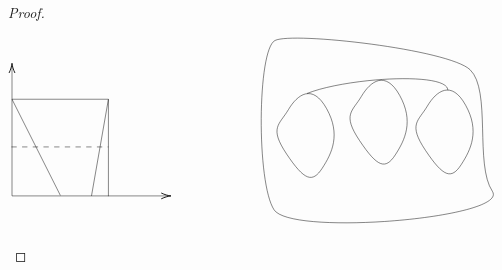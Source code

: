 \documentclass{article}
\begin{document}
\begin{proof}
\[\begin{tikzpicture}[x=0.75pt,y=0.75pt,yscale=-1,xscale=1]
    \draw    (32.81,206.45) -- (32.81,58.93) ;
    \draw [shift={(32.81,56.93)}, rotate = 90] [color={rgb, 255:red, 0; green, 0; blue, 0 }  ][line width=0.75]    (10.93,-3.29) .. controls (6.95,-1.4) and (3.31,-0.3) .. (0,0) .. controls (3.31,0.3) and (6.95,1.4) .. (10.93,3.29)   ;
    \draw    (32.81,206.45) -- (209.29,206.45) ;
    \draw [shift={(211.29,206.45)}, rotate = 180] [color={rgb, 255:red, 0; green, 0; blue, 0 }  ][line width=0.75]    (10.93,-3.29) .. controls (6.95,-1.4) and (3.31,-0.3) .. (0,0) .. controls (3.31,0.3) and (6.95,1.4) .. (10.93,3.29)   ;
    \draw    (32.81,97.47) -- (141.05,97.47) ;
    \draw    (141.05,97.47) -- (141.05,206.8) ;
    \draw    (32.81,97.47) -- (87.11,205.89) ;
    \draw    (141.05,97.47) -- (122.05,206.45) ;
    \draw  [dash pattern={on 4.5pt off 4.5pt}]  (32.11,151.22) -- (141.05,151.22) ;
    \draw   (328.11,31.22) .. controls (348.11,21.22) and (523.11,41.22) .. (547.11,64.22) .. controls (571.11,87.22) and (552.11,171.22) .. (572.11,201.22) .. controls (592.11,231.22) and (347.11,252.22) .. (327.11,222.22) .. controls (307.11,192.22) and (308.11,41.22) .. (328.11,31.22) -- cycle ;
    \draw   (343.11,109.22) .. controls (353.11,92.22) and (370.11,79.22) .. (386.11,108.22) .. controls (402.11,137.22) and (392.11,158.22) .. (381.11,175.22) .. controls (370.11,192.22) and (361.11,189.22) .. (341.11,159.22) .. controls (321.11,129.22) and (333.11,126.22) .. (343.11,109.22) -- cycle ;
    \draw    (364,91) .. controls (408.11,73.22) and (522.11,66.22) .. (522.11,87.22) ;
    \draw   (425.11,94.22) .. controls (435.11,77.22) and (452.11,64.22) .. (468.11,93.22) .. controls (484.11,122.22) and (474.11,143.22) .. (463.11,160.22) .. controls (452.11,177.22) and (443.11,174.22) .. (423.11,144.22) .. controls (403.11,114.22) and (415.11,111.22) .. (425.11,94.22) -- cycle ;
    \draw   (499.11,105.22) .. controls (509.11,88.22) and (526.11,75.22) .. (542.11,104.22) .. controls (558.11,133.22) and (548.11,154.22) .. (537.11,171.22) .. controls (526.11,188.22) and (517.11,185.22) .. (497.11,155.22) .. controls (477.11,125.22) and (489.11,122.22) .. (499.11,105.22) -- cycle ;

\end{tikzpicture}\]
\end{proof}
\end{document}
